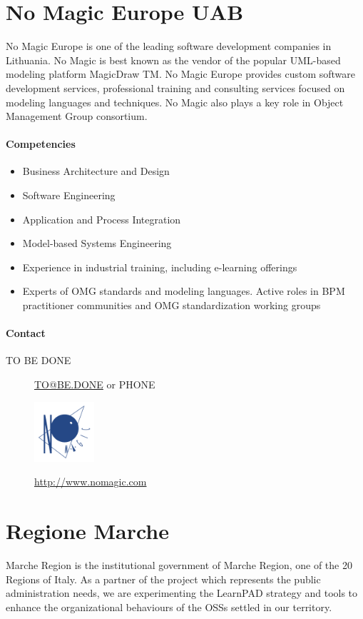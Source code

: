 \documentclass{learnpad}
\begin{document}
\section{No Magic Europe UAB}
No Magic Europe is one of the leading software development companies in
Lithuania.  No Magic is best known as the vendor of the popular UML-based
modeling platform MagicDraw TM.  No Magic Europe provides custom software
development services, professional training and consulting services focused on
modeling languages and techniques. No Magic also plays a key role in Object
Management Group consortium.

\paragraph{Competencies}
\begin{itemize}
	\item Business Architecture and Design
	\item Software Engineering
	\item Application and Process Integration
	\item Model-based Systems Engineering
	\item Experience in industrial training, including e-learning offerings
	\item Experts of OMG standards and modeling languages. Active roles in BPM
		practitioner communities and OMG standardization working groups
\end{itemize}

\paragraph{Contact}
\begin{description}
	\item[TO BE DONE] \href{mailto:TO@BE.DONE}{TO@BE.DONE} or PHONE
\end{description}

\begin{figure}[!htp]
	\centering
	\includegraphics[width=6em,keepaspectratio]{figures/nme.png}\par
	\url{http://www.nomagic.com}
\end{figure}

\section{Regione Marche}
Marche Region is the institutional government of Marche Region, one of the 20
Regions of Italy.  As a partner of the project which represents the public
administration needs, we are experimenting the LearnPAD strategy and tools to
enhance the organizational behaviours of the OSSs settled in our territory.
\end{document}

